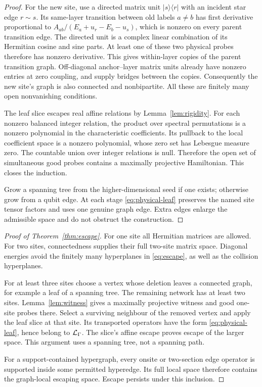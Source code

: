 \begin{proof}
For the new site, use a directed matrix unit $|s\rangle\langle r|$
with an incident star edge $r\!\sim\!s$. Its same-layer transition
between old labels $a\ne b$ has first derivative proportional to
$A_{ab}/(E_a+u_r-E_b-u_s)$, which is nonzero on every parent
transition edge. The directed unit is a complex linear combination
of its Hermitian cosine and sine parts. At least one of these two
physical probes therefore has nonzero derivative. This gives
within-layer copies of the parent transition graph.
Off-diagonal anchor--layer matrix units already have nonzero entries
at zero coupling, and supply bridges between the copies.
Consequently the new site's graph is also connected and nonbipartite.
All these are finitely many open nonvanishing conditions.

The leaf slice escapes real affine relations by
Lemma~\ref{lem:rigidity}. For each nonzero balanced integer relation,
the product over spectral permutations is a nonzero polynomial in
the characteristic coefficients. Its pullback to the local
coefficient space is a nonzero polynomial, whose zero set has
Lebesgue measure zero. The countable union over integer relations
is null. Therefore the open set of simultaneous good probes contains
a maximally projective Hamiltonian. This closes the induction.

Grow a spanning tree from the higher-dimensional seed if one exists;
otherwise grow from a qubit edge. At each stage
\eqref{eq:physical-leaf} preserves the named site tensor factors and
uses one genuine graph edge. Extra edges enlarge the admissible
space and do not obstruct the construction.
\end{proof}

\begin{proof}[Proof of Theorem~\ref{thm:escape}]
For one site all Hermitian matrices are allowed. For two sites,
connectedness supplies their full two-site matrix space. Diagonal
energies avoid the finitely many hyperplanes in \eqref{eq:escape},
as well as the collision hyperplanes.

For at least three sites choose a vertex whose deletion leaves a
connected graph, for example a leaf of a spanning tree.
The remaining network has at least two sites.
Lemma~\ref{lem:witness} gives a maximally projective witness and good
one-site probes there. Select a surviving neighbour of the removed
vertex and apply the leaf slice at that site. Its transported
operators have the form \eqref{eq:physical-leaf}, hence belong to
$\mathcal L_\Gamma$. The slice's affine escape proves escape of the larger
space. This argument uses a spanning tree, not a spanning path.

For a support-contained hypergraph, every onsite or two-section
edge operator is supported inside some permitted hyperedge.
Its full local space therefore contains the graph-local escaping
space. Escape persists under this inclusion.
\end{proof}

